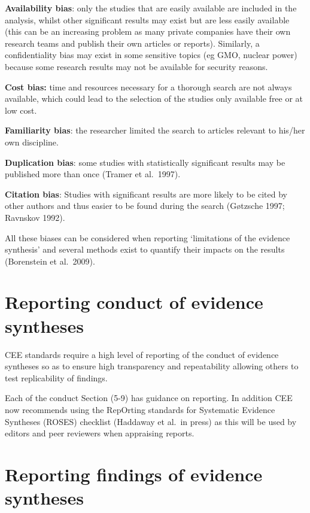 \documentclass[
  letterpaper,
  DIV=11,
  numbers=noendperiod]{scrreprt}
\begin{document}
\textbf{Availability bias}: only the studies that are easily available
are included in the analysis, whilst other significant results may exist
but are less easily available (this can be an increasing problem as many
private companies have their own research teams and publish their own
articles or reports). Similarly, a confidentiality bias may exist in
some sensitive topics (eg GMO, nuclear power) because some research
results may not be available for security reasons.

\textbf{Cost bias:} time and resources necessary for a thorough search
are not always available, which could lead to the selection of the
studies only available free or at low cost.

\textbf{Familiarity bias}: the researcher limited the search to articles
relevant to his/her own discipline.

\textbf{Duplication bias}: some studies with statistically significant
results may be published more than once (Tramer et al.~1997).

\textbf{Citation bias}: Studies with significant results are more likely
to be cited by other authors and thus easier to be found during the
search (Gøtzsche 1997; Ravnskov 1992).

All these biases can be considered when reporting `limitations of the
evidence synthesis' and several methods exist to quantify their impacts
on the results (Borenstein et al.~2009).

\section{\texorpdfstring{\textbf{Reporting conduct of evidence
syntheses}}{Reporting conduct of evidence syntheses}}\label{reporting-conduct-of-evidence-syntheses}

CEE standards require a high level of reporting of the conduct of
evidence syntheses so as to ensure high transparency and repeatability
allowing others to test replicability of findings.

Each of the conduct Section (5-9) has guidance on reporting. In addition
CEE now recommends using the RepOrting standards for Systematic Evidence
Syntheses (ROSES) checklist (Haddaway et al.~in press) as this will be
used by editors and peer reviewers when appraising reports.

\section{\texorpdfstring{\textbf{Reporting findings of evidence
syntheses}}{Reporting findings of evidence syntheses}}\label{reporting-findings-of-evidence-syntheses}
\end{document}
